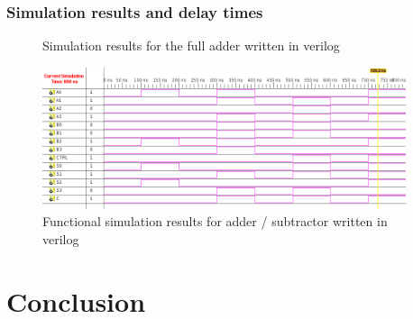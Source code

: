 \documentclass[11pt]{article}
\begin{document}
\subsubsection{Simulation results and delay times}
\begin{figure}[htpb]
	\centering
	\caption{Simulation results for the full adder written in verilog}
	\label{fig:FA_verilog}
\end{figure}

\begin{figure}[htpb]
	\centering
	\includegraphics[width=0.95\textwidth]{add_sub_test_verilog}
	\caption{Functional simulation results for adder / subtractor written in verilog}
	\label{fig:AS_verilog}
\end{figure}

\section{Conclusion}
\end{document}
